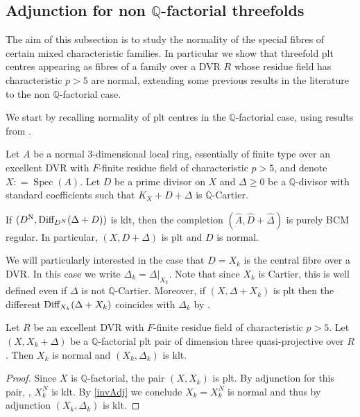 \documentclass[a4paper,12pt]{book}
\DeclareMathOperator{\Spec}{Spec}
\newcommand{\bQ}{\mathbb{Q}}
\begin{document}
	\subsection{Adjunction for non $\mathbb{Q}$-factorial threefolds}
	The aim of this subsection is to study the normality of the special fibres of certain mixed characteristic families. In particular we show that threefold plt centres appearing as fibres of a family over a DVR $R$ whose residue field has characteristic $p>5$ are normal, extending some previous results in the literature to the non $\mathbb{Q}$-factorial case. 
	
	We start by recalling normality of plt centres in the $\mathbb{Q}$-factorial case, using results from \cite{ma2019analog}.
	\begin{theorem}{\cite[Theorem G]{ma2019analog}}\label{invAdj}
		Let $A$ be a normal 3-dimensional local ring, essentially of finite type over an excellent DVR with $F$-finite residue field of characteristic $p > 5$, and denote $X: = \Spec (A)$.
		Let $D$ be a prime divisor on $X$ and $\Delta \geq 0$ be a $\bQ$-divisor with standard coefficients such that $K_X + D + \Delta$ is $\bQ$-Cartier.  
		
		If $(D^{\mathrm{N}}, \textup{Diff}_{D^N}(\Delta+D))$ is klt, then the completion $(\widehat{A}, \widehat{D}+\widehat{\Delta})$ is purely BCM regular. In particular, $(X, D+\Delta)$ is plt and $D$ is normal.	
	\end{theorem}
	
	We will particularly interested in the case that $D=X_{k}$ is the central fibre over a DVR. 
	In this case we write $\Delta_{k}=\Delta|_{X_k}$. Note that since $X_{k}$ is Cartier, this is well defined even if $\Delta$ is not $\mathbb{Q}$-Cartier.
	Moreover, if $(X,\Delta+X_{k})$ is plt then the different $\textup{Diff}_{X_k}(\Delta+X_k)$ coincides with $\Delta_{k}$ by \cite[Proposition 4.5]{kk-singbook}.
	
	\begin{corollary}\label{normality}
		Let $R$ be an excellent DVR with $F$-finite residue field of characteristic $p>5$. Let $(X,X_{k}+\Delta)$ be a $\mathbb{Q}$-factorial plt pair of dimension three quasi-projective over $R$. 
		Then $X_{k}$ is normal and $(X_k, \Delta_k)$ is klt.
	\end{corollary}

	\begin{proof}
		Since $X$ is $\mathbb{Q}$-factorial, the pair $(X, X_k)$ is plt.
			By adjunction for this pair, \cite[Lemma 4.8]{kk-singbook}, $X^{N}_{k}$ is klt.  
		By \autoref{invAdj} we conclude $X_{k}=X^{N}_{k}$ is normal and thus by adjunction $(X_k, \Delta_k)$ is klt.
	\end{proof}
	
\end{document}
